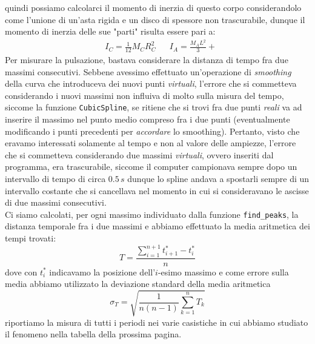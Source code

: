 \documentclass{article}
\begin{document}
quindi possiamo calcolarci il momento di inerzia di questo corpo considerandolo come l'unione di un'asta rigida e un disco di spessore non trascurabile, dunque il momento di inerzia delle sue "parti" risulta essere pari a:
\begin{align*}
	&I_C = \frac{1}{12} M_C R^2_C & &I_A = \frac{M_A L^2}{3} + 
\end{align*}
Per misurare la pulsazione, bastava considerare la distanza di tempo fra due massimi consecutivi. Sebbene avessimo effettuato un'operazione di \emph{smoothing} della curva che introduceva dei nuovi punti \emph{virtuali}, l'errore che si commetteva considerando i nuovi massimi non influiva di molto sulla misura del tempo, siccome la funzione \texttt{CubicSpline}, se ritiene che si trovi fra due punti \emph{reali} va ad inserire il massimo nel punto medio compreso fra i due punti (eventualmente modificando i punti precedenti per \emph{accordare} lo smoothing). Pertanto, visto che eravamo interessati solamente al tempo e non al valore delle ampiezze, l'errore che si commetteva considerando due massimi \emph{virtuali}, ovvero inseriti dal programma, era trascurabile, siccome il computer campionava sempre dopo un intervallo di tempo di circa $0.5 \, s$ dunque lo spline andava a spostarli sempre di un intervallo costante che si cancellava nel momento in cui si consideravano le ascisse di due massimi consecutivi. \\
Ci siamo calcolati, per ogni massimo individuato dalla funzione \texttt{find\_peaks}, la distanza temporale fra i due massimi e abbiamo effettuato la media aritmetica dei tempi trovati:
\begin{equation}
	T = \frac{\sum\limits_{i=1}^{n+1} t^{*}_{i+1} - t^{*}_i}{n}
\end{equation}
dove con $t^{*}_{i}$ indicavamo la posizione dell'$i$-esimo massimo e come errore sulla media abbiamo utilizzato la deviazione standard della media aritmetica
\begin{equation}
	\sigma_{T} = \sqrt{\frac{1}{n(n-1)}\sum_{k=1}^{n}{T_k}}
\end{equation}
riportiamo la misura di tutti i periodi nei varie casistiche in cui abbiamo studiato il fenomeno nella tabella della prossima pagina.
\end{document}
